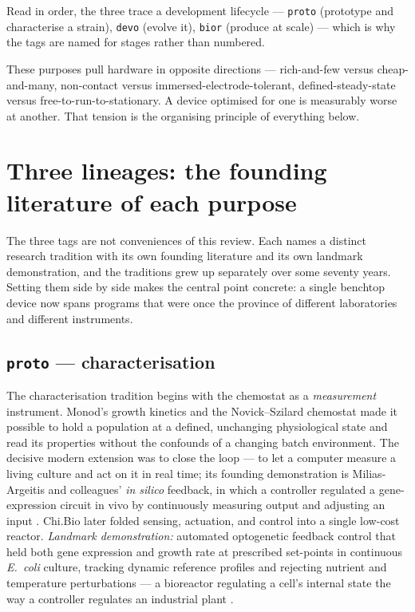 \documentclass[11pt,a4paper]{article}
\begin{document}
Read in order, the three trace a development lifecycle --- \texttt{proto} (prototype and
characterise a strain), \texttt{devo} (evolve it), \texttt{bior} (produce at scale) --- which
is why the tags are named for stages rather than numbered.

These purposes pull hardware in opposite directions --- rich-and-few versus cheap-and-many,
non-contact versus immersed-electrode-tolerant, defined-steady-state versus
free-to-run-to-stationary. A device optimised for one is measurably worse at another. That
tension is the organising principle of everything below.

\section{Three lineages: the founding literature of each purpose}
\label{sec:lineages}

The three tags are not conveniences of this review. Each names a distinct research tradition with
its own founding literature and its own landmark demonstration, and the traditions grew up
separately over some seventy years. Setting them side by side makes the central point concrete:
a single benchtop device now spans programs that were once the province of different laboratories
and different instruments.

\subsection{\texttt{proto} --- characterisation}
The characterisation tradition begins with the chemostat as a \emph{measurement} instrument.
Monod's growth kinetics and the Novick--Szilard chemostat \cite{monod1949,novick1950} made it
possible to hold a population at a defined, unchanging physiological state and read its properties
without the confounds of a changing batch environment. The decisive modern extension was to close
the loop --- to let a computer measure a living culture and act on it in real time; its founding
demonstration is Milias-Argeitis and colleagues' \emph{in silico} feedback, in which a controller
regulated a gene-expression circuit in vivo by continuously measuring output and adjusting an
input \cite{milias2011}. Chi.Bio \cite{steel2020chibio} later folded sensing, actuation, and
control into a single low-cost reactor.
\emph{Landmark demonstration:} automated optogenetic feedback control that held both gene
expression and growth rate at prescribed set-points in continuous \emph{E.~coli} culture, tracking
dynamic reference profiles and rejecting nutrient and temperature perturbations --- a bioreactor
regulating a cell's internal state the way a controller regulates an industrial plant
\cite{milias2016}.
\end{document}
